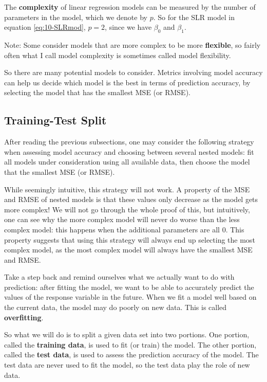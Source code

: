\documentclass[
]{book}
\begin{document}
The \textbf{complexity} of linear regression models can be measured by the number of parameters in the model, which we denote by \(p\). So for the SLR model in equation \eqref{eq:10-SLRmod}, \(p=2\), since we have \(\beta_0\) and \(\beta_1\).

Note: Some consider models that are more complex to be more \textbf{flexible}, so fairly often what I call model complexity is sometimes called model flexibility.

So there are many potential models to consider. Metrics involving model accuracy can help us decide which model is the best in terms of prediction accuracy, by selecting the model that has the smallest MSE (or RMSE).

\hypertarget{training-test-split}{%
\subsection{Training-Test Split}\label{training-test-split}}

After reading the previous subsections, one may consider the following strategy when assessing model accuracy and choosing between several nested models: fit all models under consideration using all available data, then choose the model that the smallest MSE (or RMSE).

While seemingly intuitive, this strategy will not work. A property of the MSE and RMSE of nested models is that these values only decrease as the model gets more complex! We will not go through the whole proof of this, but intuitively, one can see why the more complex model will never do worse than the less complex model: this happens when the additional parameters are all 0. This property suggests that using this strategy will always end up selecting the most complex model, as the most complex model will always have the smallest MSE and RMSE.

Take a step back and remind ourselves what we actually want to do with prediction: after fitting the model, we want to be able to accurately predict the values of the response variable in the future. When we fit a model well based on the current data, the model may do poorly on new data. This is called \textbf{overfitting}.

So what we will do is to split a given data set into two portions. One portion, called the \textbf{training data}, is used to fit (or train) the model. The other portion, called the \textbf{test data}, is used to assess the prediction accuracy of the model. The test data are never used to fit the model, so the test data play the role of new data.
\end{document}

